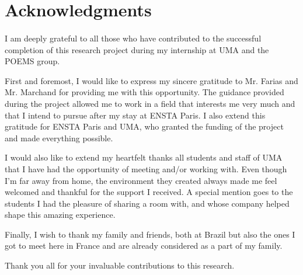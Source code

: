 \section*{Acknowledgments}
\paragraph{}

I am deeply grateful to all those who have contributed to the successful completion of this research project during my internship at UMA and the POEMS group.

First and foremost, I would like to express my sincere gratitude to Mr. Farias and Mr. Marchand for providing me with this opportunity. The guidance provided during the project allowed me to work in a field that interests me very much and that I intend to pursue after my stay at ENSTA Paris. I also extend this gratitude for ENSTA Paris and UMA, who granted the funding of the project and made everything possible.

I would also like to extend my heartfelt thanks all students and staff of UMA that I have had the opportunity of meeting and/or working with. Even though I'm far away from home, the environment they created always made me feel welcomed and thankful for the support I received. A special mention goes to the students I had the pleasure of sharing a room with, and whose company helped shape this amazing experience.

Finally, I wish to thank my family and friends, both at Brazil but also the ones I got to meet here in France and are already considered as a part of my family. 

Thank you all for your invaluable contributions to this research.